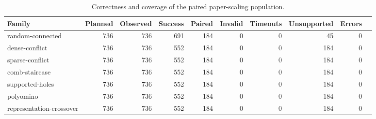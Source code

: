 \begin{table}[t]
\caption{Correctness and coverage of the paired paper-scaling population.}
\label{tab:paper-scaling-coverage}
\begin{tabular}{lrrrrrrrrr}
\toprule
Family & Planned & Observed & Success & Paired & Invalid & Timeouts & Unsupported & Errors \\
\midrule
random-connected & 736 & 736 & 691 & 184 & 0 & 0 & 45 & 0 \\
dense-conflict & 736 & 736 & 552 & 184 & 0 & 0 & 184 & 0 \\
sparse-conflict & 736 & 736 & 552 & 184 & 0 & 0 & 184 & 0 \\
comb-staircase & 736 & 736 & 552 & 184 & 0 & 0 & 184 & 0 \\
supported-holes & 736 & 736 & 552 & 184 & 0 & 0 & 184 & 0 \\
polyomino & 736 & 736 & 552 & 184 & 0 & 0 & 184 & 0 \\
representation-crossover & 736 & 736 & 552 & 184 & 0 & 0 & 184 & 0 \\
\bottomrule
\end{tabular}
\end{table}

